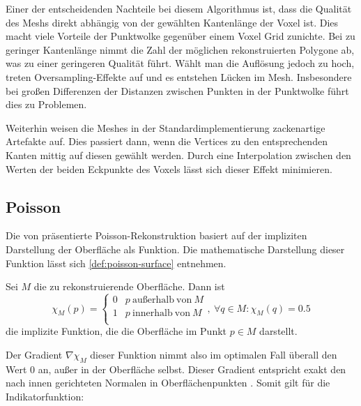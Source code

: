 Einer der entscheidenden Nachteile bei diesem Algorithmus ist, dass die Qualität des Meshs direkt abhängig von der gewählten Kantenlänge der Voxel ist.
Dies macht viele Vorteile der Punktwolke gegenüber einem Voxel Grid zunichte.
Bei zu geringer Kantenlänge nimmt die Zahl der möglichen rekonstruierten Polygone ab, was zu einer geringeren Qualität führt.
Wählt man die Auflösung jedoch zu hoch, treten Oversampling-Effekte auf und es entstehen Lücken im Mesh.
Insbesondere bei großen Differenzen der Distanzen zwischen Punkten in der Punktwolke führt dies zu Problemen.

Weiterhin weisen die Meshes in der Standardimplementierung zackenartige Artefakte auf.
Dies passiert dann, wenn die Vertices zu den entsprechenden Kanten mittig auf diesen gewählt werden.
Durch eine Interpolation zwischen den Werten der beiden Eckpunkte des Voxels lässt sich dieser Effekt minimieren.


\subsection{Poisson}
\label{subsec:poisson}

Die \citeyear{kazhdan2006poisson} von \citeauthor{kazhdan2006poisson} präsentierte Poisson-Rekonstruktion \cite{kazhdan2006poisson} basiert auf der impliziten Darstellung der Oberfläche als Funktion.
Die mathematische Darstellung dieser Funktion lässt sich \autoref{def:poisson-surface} entnehmen.

\begin{definition}
\label{def:poisson-surface}
Sei $M$ die zu rekonstruierende Oberfläche.
Dann ist
\begin{equation}
\chi_M(p) = \left\{
\begin{array}{ll}
0 & p\ \mathrm{außerhalb\ von}\ M\\
1 & p\ \mathrm{innerhalb\ von}\ M\\
\end{array}
\right.
,\ \forall q \in M : \chi_M(q) = 0.5
\end{equation}
die implizite Funktion, die die Oberfläche im Punkt $p \in M$ darstellt.
\end{definition}

Der Gradient $\nabla \chi_M$ dieser Funktion nimmt also im optimalen Fall überall den Wert $0$ an, außer in der Oberfläche selbst.
Dieser Gradient entspricht exakt den nach innen gerichteten Normalen in Oberflächenpunkten \cite[Abs. 3]{kazhdan2006poisson}.
Somit gilt für die Indikatorfunktion:

